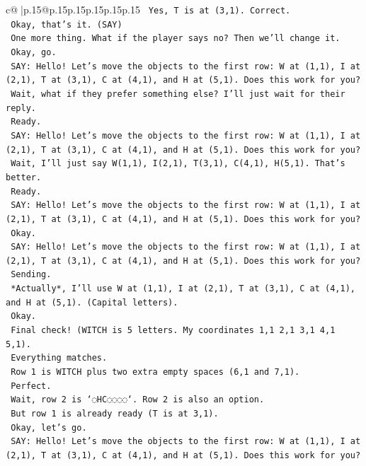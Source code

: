 \documentclass{article}
\begin{document}
{\begin{supertabular}{c@{$\;$}|p{.15\linewidth}@{}p{.15\linewidth}p{.15\linewidth}p{.15\linewidth}p{.15\linewidth}p{.15\linewidth}}
{{{\texttt{    Yes, T is at (3,1). Correct.} \\
\texttt{    Okay, that's it. (SAY)} \\
\texttt{    One more thing. What if the player says no? Then we'll change it.} \\
\texttt{    Okay, go.} \\
\texttt{    SAY: Hello! Let's move the objects to the first row: W at (1,1), I at (2,1), T at (3,1), C at (4,1), and H at (5,1). Does this work for you?} \\
\texttt{    Wait, what if they prefer something else? I'll just wait for their reply.} \\
\texttt{    Ready.} \\
\texttt{    SAY: Hello! Let's move the objects to the first row: W at (1,1), I at (2,1), T at (3,1), C at (4,1), and H at (5,1). Does this work for you?} \\
\texttt{    Wait, I'll just say W(1,1), I(2,1), T(3,1), C(4,1), H(5,1). That's better.} \\
\texttt{    Ready.} \\
\texttt{    SAY: Hello! Let's move the objects to the first row: W at (1,1), I at (2,1), T at (3,1), C at (4,1), and H at (5,1). Does this work for you?} \\
\texttt{    Okay.} \\
\texttt{    SAY: Hello! Let's move the objects to the first row: W at (1,1), I at (2,1), T at (3,1), C at (4,1), and H at (5,1). Does this work for you?} \\
\texttt{    Sending.} \\
\texttt{    *Actually*, I'll use W at (1,1), I at (2,1), T at (3,1), C at (4,1), and H at (5,1). (Capital letters).} \\
\texttt{    Okay.} \\
\texttt{    Final check! (WITCH is 5 letters. My coordinates 1,1 2,1 3,1 4,1 5,1).} \\
\texttt{    Everything matches.} \\
\texttt{    Row 1 is WITCH plus two extra empty spaces (6,1 and 7,1).} \\
\texttt{    Perfect.} \\
\texttt{    Wait, row 2 is `◌HC◌◌◌◌`. Row 2 is also an option.} \\
\texttt{    But row 1 is already ready (T is at 3,1).} \\
\texttt{    Okay, let's go.} \\
\texttt{    SAY: Hello! Let's move the objects to the first row: W at (1,1), I at (2,1), T at (3,1), C at (4,1), and H at (5,1). Does this work for you?} \\
}}}
\end{supertabular}}
\end{document}
